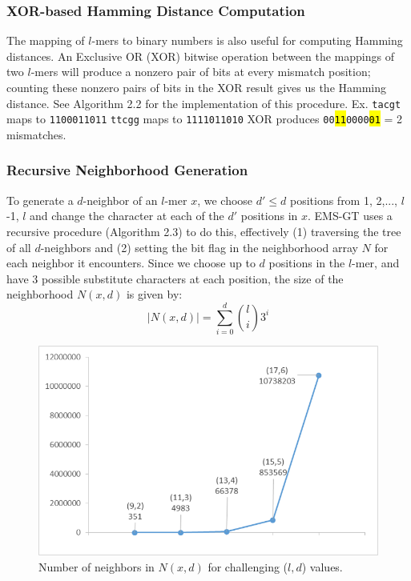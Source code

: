 \documentclass[oneside,12pt]{DISCSthesis}
\begin{document}
{		\subsubsection{XOR-based Hamming Distance Computation}
			The mapping of $l$-mers to binary numbers  is also useful for computing Hamming distances. An Exclusive OR (XOR) bitwise operation between the mappings of two $l$-mers will produce a nonzero pair of bits at every mismatch position; counting these nonzero pairs of bits in the XOR result gives us the Hamming distance. See Algorithm 2.2 for the implementation of this procedure.\newline
			\noindent\hspace*{40pt} {\small Ex.	\texttt{tacgt} maps to \texttt{1100011011} \newline
				\vspace*{2pt}\hspace*{62pt} \texttt{ttcgg} maps to \texttt{1111011010} \newline				
				\hspace*{62pt}	XOR produces \hspace*{3pt}\texttt{00\hl{11}0000\hl{01}} = 2 mismatches.}

		\subsubsection{Recursive Neighborhood Generation}
			To generate a $d$-neighbor of an $l$-mer $x$, we choose $d' \leq d$ positions from 1, 2,..., $l$-1, $l$ and change the character at each of the $d'$ positions in $x$. EMS-GT uses a recursive procedure (Algorithm 2.3) to do this, effectively (1) traversing the tree of all $d$-neighbors and (2) setting the bit flag in the neighborhood array $N$ for each neighbor it encounters. Since we choose up to $d$ positions in the $l$-mer, and have 3 possible substitute characters at each position, the size of the neighborhood $N(x,d)$ is given by:
			 \begin{equation}
				\left|N(x,d)\right| = \sum_{i=0}^d \binom{l}{i} 3^{i}
				\end{equation}

		\begin{figure}[h]\label{fig:nxd}
			\centering
			\includegraphics{img/nbrhd_growth.png}
			\caption{Number of neighbors in $N(x,d)$ for challenging ($l,d$) values.}
			\end{figure}

}
\end{document}
